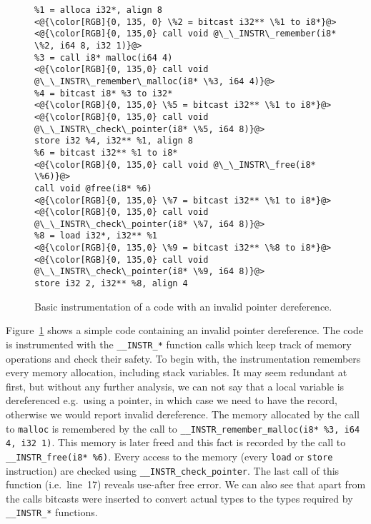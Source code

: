 \begin{figure}[t]
\begin{lstlisting}
%1 = alloca i32*, align 8
<@{\color[RGB]{0, 135, 0} \%2 = bitcast i32** \%1 to i8*}@>
<@{\color[RGB]{0, 135,0} call void @\_\_INSTR\_remember(i8* \%2, i64 8, i32 1)}@>
%3 = call i8* malloc(i64 4)
<@{\color[RGB]{0, 135,0} call void @\_\_INSTR\_remember\_malloc(i8* \%3, i64 4)}@>
%4 = bitcast i8* %3 to i32*
<@{\color[RGB]{0, 135,0} \%5 = bitcast i32** \%1 to i8*}@>
<@{\color[RGB]{0, 135,0} call void @\_\_INSTR\_check\_pointer(i8* \%5, i64 8)}@>
store i32 %4, i32** %1, align 8
%6 = bitcast i32** %1 to i8*
<@{\color[RGB]{0, 135,0} call void @\_\_INSTR\_free(i8* \%6)}@>
call void @free(i8* %6)
<@{\color[RGB]{0, 135,0} \%7 = bitcast i32** \%1 to i8*}@>
<@{\color[RGB]{0, 135,0} call void @\_\_INSTR\_check\_pointer(i8* \%7, i64 8)}@>
%8 = load i32*, i32** %1
<@{\color[RGB]{0, 135,0} \%9 = bitcast i32** \%8 to i8*}@>
<@{\color[RGB]{0, 135,0} call void @\_\_INSTR\_check\_pointer(i8* \%9, i64 8)}@>
store i32 2, i32** %8, align 4
\end{lstlisting}
\caption{Basic instrumentation of a code with an invalid pointer
  dereference.}
\label{fig:example1}
\end{figure}

Figure~\ref{fig:example1} shows a simple code containing an invalid
pointer dereference. The code is instrumented with the
\texttt{\_\_INSTR\_*} function calls which keep track of memory
operations and check their safety. To begin with, the instrumentation
remembers every memory allocation, including stack variables. It may
seem redundant at first, but without any further analysis, we can not
say that a local variable is dereferenced e.g.~using a pointer, in
which case we need to have the record, otherwise we would report
invalid dereference.
The memory allocated by the call to \texttt{malloc} is remembered by the call
to \texttt{\_\_INSTR\_remember\_malloc(i8* \%3, i64 4, i32 1)}. This memory is
later freed and this fact is recorded by the call to
\texttt{\_\_INSTR\_free(i8* \%6)}. Every access to the memory (every
\texttt{load} or \texttt{store} instruction) are checked using
\texttt{\_\_INSTR\_check\_pointer}. The last call of this function
(i.e.~line~17) reveals use-after free error. We can also see that apart from
the  calls bitcasts were inserted to convert actual types
to the types required by \texttt{\_\_INSTR\_*} functions.

